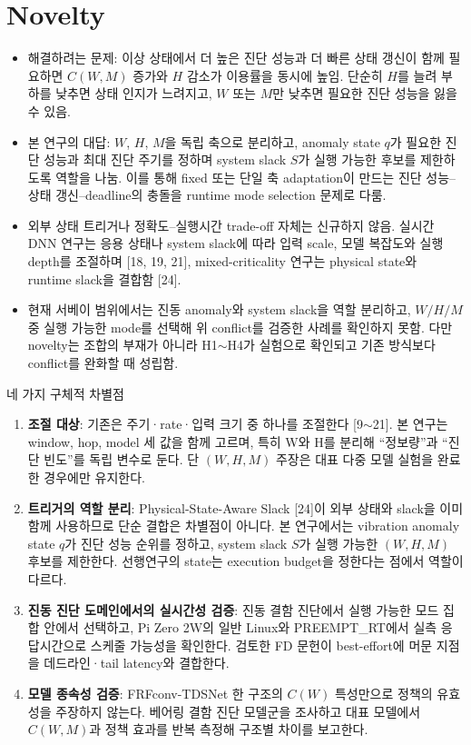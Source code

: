 \documentclass[10pt]{article}
\begin{document}
\section{Novelty}
\begin{itemize}
\item 해결하려는 문제: 이상 상태에서 더 높은 진단 성능과 더 빠른 상태 갱신이 함께 필요하면 $C(W,M)$ 증가와 $H$ 감소가 이용률을 동시에 높임. 단순히 $H$를 늘려 부하를 낮추면 상태 인지가 느려지고, $W$ 또는 $M$만 낮추면 필요한 진단 성능을 잃을 수 있음.
\item 본 연구의 대답: $W$, $H$, $M$을 독립 축으로 분리하고, anomaly state $q$가 필요한 진단 성능과 최대 진단 주기를 정하며 system slack $S$가 실행 가능한 후보를 제한하도록 역할을 나눔. 이를 통해 fixed 또는 단일 축 adaptation이 만드는 진단 성능--상태 갱신--deadline의 충돌을 runtime mode selection 문제로 다룸.
\item 외부 상태 트리거나 정확도--실행시간 trade-off 자체는 신규하지 않음. 실시간 DNN 연구는 응용 상태나 system slack에 따라 입력 scale, 모델 복잡도와 실행 depth를 조절하며 [18, 19, 21], mixed-criticality 연구는 physical state와 runtime slack을 결합함 [24].
\item 현재 서베이 범위에서는 진동 anomaly와 system slack을 역할 분리하고, $W/H/M$ 중 실행 가능한 mode를 선택해 위 conflict를 검증한 사례를 확인하지 못함. 다만 novelty는 조합의 부재가 아니라 H1$\sim$H4가 실험으로 확인되고 기존 방식보다 conflict를 완화할 때 성립함.
\end{itemize}
\noindent 네 가지 구체적 차별점
\begin{enumerate}
\item \textbf{조절 대상}: 기존은 주기·rate·입력 크기 중 하나를 조절한다 [9$\sim$21]. 본 연구는 window, hop, model 세 값을 함께 고르며, 특히 W와 H를 분리해 ``정보량''과 ``진단 빈도''를 독립 변수로 둔다. 단 $(W,H,M)$ 주장은 대표 다중 모델 실험을 완료한 경우에만 유지한다.
\item \textbf{트리거의 역할 분리}: Physical-State-Aware Slack [24]이 외부 상태와 slack을 이미 함께 사용하므로 단순 결합은 차별점이 아니다. 본 연구에서는 vibration anomaly state $q$가 진단 성능 순위를 정하고, system slack $S$가 실행 가능한 $(W,H,M)$ 후보를 제한한다. 선행연구의 state는 execution budget을 정한다는 점에서 역할이 다르다.
\item \textbf{진동 진단 도메인에서의 실시간성 검증}: 진동 결함 진단에서 실행 가능한 모드 집합 안에서 선택하고, Pi Zero 2W의 일반 Linux와 PREEMPT\_RT에서 실측 응답시간으로 스케줄 가능성을 확인한다. 검토한 FD 문헌이 best-effort에 머문 지점을 데드라인·tail latency와 결합한다.
\item \textbf{모델 종속성 검증}: FRFconv-TDSNet 한 구조의 $C(W)$ 특성만으로 정책의 유효성을 주장하지 않는다. 베어링 결함 진단 모델군을 조사하고 대표 모델에서 $C(W,M)$과 정책 효과를 반복 측정해 구조별 차이를 보고한다.
\end{enumerate}
\end{document}

